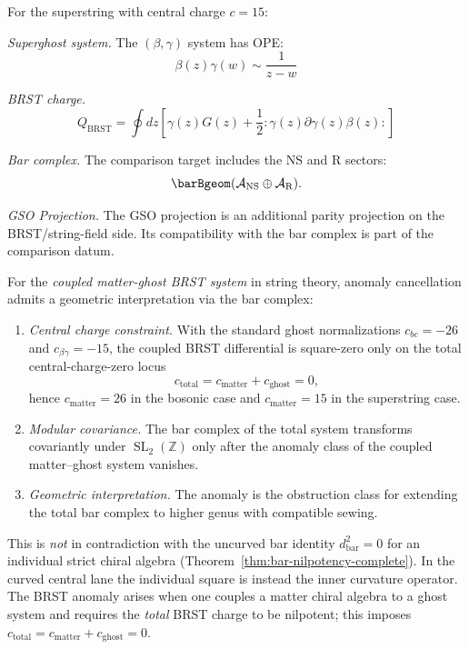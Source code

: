 \begin{example}
For the superstring with central charge $c = 15$:

\emph{Superghost system.} The $(\beta,\gamma)$ system has OPE:
\[\beta(z)\gamma(w) \sim \frac{1}{z-w}\]

\emph{BRST charge.}
\[Q_{\text{BRST}} = \oint dz \left[ \gamma(z)G(z) + \frac{1}{2}:\gamma(z)\partial\gamma(z)\beta(z): \right]\]

\emph{Bar complex.} The comparison target includes the NS and R
sectors:
\[
\barBgeom(\mathcal{A}_{\text{NS}} \oplus \mathcal{A}_{\text{R}}).
\]

\emph{GSO Projection.} The GSO projection is an additional parity
projection on the BRST/string-field side. Its compatibility with the
bar complex is part of the comparison datum.
\end{example}

\begin{conjecture}\label{conj:anomaly-cancellation}
For the \emph{coupled matter-ghost BRST system} in string theory, anomaly cancellation admits a geometric interpretation via the bar complex:

\begin{enumerate}
\item \emph{Central charge constraint.} With the standard ghost
normalizations $c_{bc}=-26$ and $c_{\beta\gamma}=-15$, the coupled
BRST differential is square-zero only on the total central-charge-zero
locus
\[
c_{\mathrm{total}}=c_{\mathrm{matter}}+c_{\mathrm{ghost}}=0,
\]
hence $c_{\mathrm{matter}}=26$ in the bosonic case and
$c_{\mathrm{matter}}=15$ in the superstring case.

\item \emph{Modular covariance.} The bar complex of the total system
transforms covariantly under $\operatorname{SL}_2(\mathbb{Z})$ only after
the anomaly class of the coupled matter--ghost system vanishes.

\item \emph{Geometric interpretation.} The anomaly is the obstruction
class for extending the total bar complex to higher genus with
compatible sewing.
\end{enumerate}

\end{conjecture}

\begin{remark}
This is \emph{not} in contradiction with the uncurved bar identity
$d_{\text{bar}}^2 = 0$ for an individual strict chiral algebra
(Theorem~\ref{thm:bar-nilpotency-complete}). In the curved central
lane the individual square is instead the inner curvature operator.
The BRST anomaly arises when one couples a matter chiral algebra to a
ghost system and requires the \emph{total} BRST charge to be
nilpotent; this imposes
$c_{\text{total}} = c_{\text{matter}} + c_{\text{ghost}} = 0$.
\end{remark}

